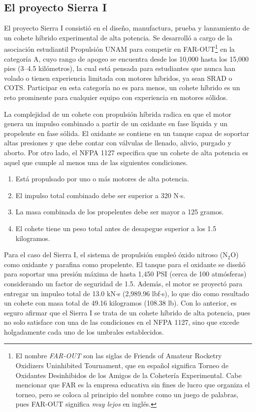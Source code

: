 \subsection{El proyecto Sierra I}
El proyecto Sierra I consistió en el diseño, manufactura, prueba y lanzamiento de un cohete híbrido experimental de alta potencia. Se desarrolló a cargo de la asociación estudiantil Propulsión UNAM para competir en FAR-OUT\footnote{El nombre \textit{FAR-OUT} son las siglas de Friends of Amateur Rocketry Oxidizers Uninhibited Tournament, que en español significa Torneo de Oxidantes Desinhibidos de los Amigos de la Cohetería Experimental. Cabe mencionar que FAR es la empresa educativa sin fines de lucro que organiza el torneo, pero se coloca al principio del nombre como un juego de palabras, pues FAR-OUT significa \textit{muy lejos} en inglés.} en la categoría A, cuyo rango de apogeo se encuentra desde los 10,000 hasta los 15,000 pies (3--4.5 kilómetros), la cual está pensada para estudiantes que nunca han volado o tienen experiencia limitada con motores híbridos, ya sean SRAD o COTS\cite[p.67]{farout_r&r}. Participar en esta categoría no es para menos, un cohete híbrido es un reto prominente para cualquier equipo con experiencia en motores sólidos.

La complejidad de un cohete con propulsión híbrida radica en que el motor genera un impulso combinado a partir de un oxidante en fase líquida y un propelente en fase sólida. El oxidante se contiene en un tanque capaz de soportar altas presiones y que debe contar con válvulas de llenado, alivio, purgado y aborto. Por otro lado, el NFPA 1127 especifica que un cohete de alta potencia es aquel que cumple al menos una de las siguientes condiciones\cite[p.1127-8]{nfpa1127}.

\begin{enumerate}
\item Está propulsado por uno o más motores de alta potencia.
\item El impulso total combinado debe ser superior a 320 N$\cdot$s.
\item La masa combinada de los propelentes debe ser mayor a 125 gramos.
\item El cohete tiene un peso total antes de desapegue superior a los 1.5 kilogramos. 
\end{enumerate}

Para el caso del Sierra I, el sistema de propulsión empleó óxido nitroso (N$_2$O) como oxidante y parafina como propelente. El tanque para el oxidante se diseñó para soportar una presión máxima de hasta 1,450 PSI (cerca de 100 atmósferas) considerando un factor de seguridad de 1.5. Además, el motor se proyectó para entregar un impulso total de 13.0 kN$\cdot$s (2,989.96 lbf$\cdot$s)\cite[p.4]{sierrai_techreport}, lo que dio como resultado un cohete con masa total de 49.16 kilogramos (108.38 lb)\cite[p.66]{sierrai_techreport}. Con lo anterior, es seguro afirmar que el Sierra I se trata de un cohete híbrido de alta potencia, pues no solo satisface con una de las condiciones en el NFPA 1127, sino que excede holgadamente cada uno de los umbrales establecidos.

